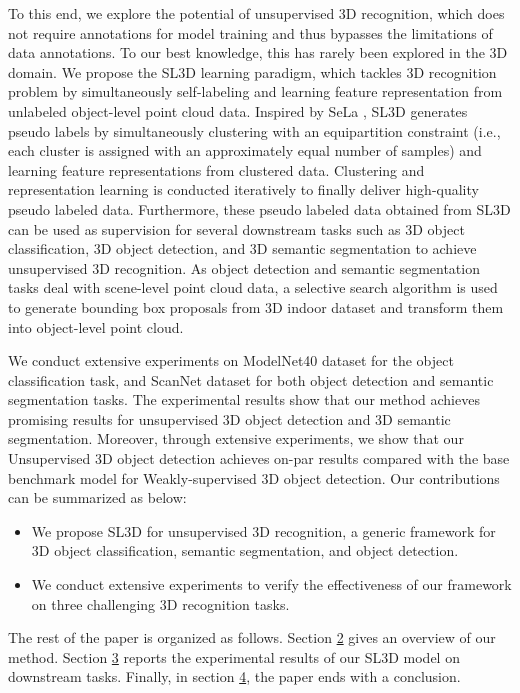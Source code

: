 \documentclass{article}
\begin{document}
To this end, we explore the potential of unsupervised 3D recognition, which does not require annotations for model training and thus bypasses the limitations of data annotations. To our best knowledge, this has rarely been  explored in the 3D domain. We propose the SL3D learning paradigm, which tackles 3D recognition problem by simultaneously self-labeling and learning feature representation from unlabeled object-level point cloud data. Inspired by SeLa \cite{asano2020self}, SL3D generates pseudo labels by simultaneously clustering with an equipartition constraint (i.e., each cluster is assigned with an approximately equal number of samples) and learning feature representations from clustered data. Clustering and representation learning is conducted iteratively to finally deliver high-quality pseudo labeled data. Furthermore, these pseudo labeled data obtained from SL3D can be used as supervision for several downstream tasks such as 3D object classification, 3D object detection, and 3D semantic segmentation to achieve unsupervised 3D recognition. As object detection and semantic segmentation tasks deal with scene-level point cloud data, a selective search algorithm is used to generate bounding box proposals from 3D indoor dataset and transform them into object-level point cloud.

We conduct extensive experiments on ModelNet40 dataset \cite{wu20153d} for the object classification task, and ScanNet \cite{dai2017scannet} dataset for both object detection and semantic segmentation tasks.
The experimental results show that our method achieves promising results for unsupervised 3D object detection and 3D semantic segmentation. Moreover, through extensive experiments, we show that our Unsupervised 3D object detection achieves on-par results compared with the base benchmark model for Weakly-supervised 3D object detection. Our contributions can be summarized as below:
\setlength{\parskip}{0.0em}
\begin{itemize}
    \item{We propose SL3D for unsupervised 3D recognition, a generic framework for 3D object classification, semantic segmentation, and object detection.} 
    \item{We conduct extensive experiments to verify the effectiveness of our framework on three challenging 3D recognition tasks.}
\end{itemize}
\setlength{\parskip}{0.0em}
The rest of the paper is organized as follows. Section \hyperref[sec:method]{2} gives an overview of our method. Section \hyperref[sec:exp]{3} reports the experimental results of our SL3D model on downstream tasks. Finally, in section \hyperref[sec:end]{4}, the paper ends with a conclusion.
\end{document}

